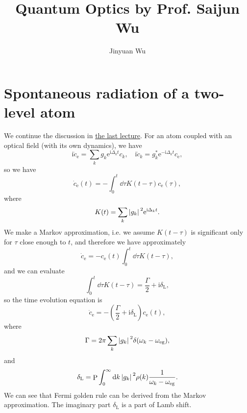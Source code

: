 \documentclass[hyperref, a4paper]{article}
\title{Quantum Optics by Prof. Saijun Wu}
\author{Jinyuan Wu}
\DeclareMathOperator{\primevalue}{P}
\newcommand*{\ii}{\mathrm{i}}
\newcommand*{\ee}{\mathrm{e}}
\begin{document}
\maketitle

\section{Spontaneous radiation of a two-level atom}

We continue the discussion in \href{11-18.pdf}{the last lecture}.
For an atom coupled with an optical field (with its own dynamics), we have 
\[
    \ii \dot{c}_\text{e} = \sum_k g_k \ee^{\ii \Delta_k t} c_k, \quad 
    \ii \dot{c}_k = g_k^* \ee^{- \ii \Delta_k t} c_\text{e},
\]
so we have 
\begin{equation}
    \dot{c}_\text{e}(t) = - \int_0^t \dd{\tau} K(t - \tau) c_\text{e}(\tau),
    \label{eq:one-component-eom}
\end{equation}
where 
\begin{equation}
    K(t) = \sum_k \abs*{g_k}^2 \ee^{\ii \Delta_k t}.
\end{equation}
We make a Markov approximation, i.e. we assume $K(t - \tau)$ is significant only for $\tau$ close enough to $t$,
and therefore we have approximately
\[
    \dot{c}_\text{e} = - c_\text{e}(t) \int_0^t \dd{\tau} K(t - \tau),
\]
and we can evaluate 
\[
    \int_0^t \dd{\tau} K(t - \tau) = \frac{\Gamma}{2} + \ii \delta_\text{L},
\]
so the time evolution equation is 
\begin{equation}
    \dot{c}_\text{e} = - \left( \frac{\Gamma}{2} + \ii \delta_\text{L} \right) c_\text{e}(t) ,
    \label{eq:markov-eq}
\end{equation}
where 
\begin{equation}
    \Gamma = 2 \pi \sum_k \abs*{g_k}^2 \delta(\omega_k - \omega_\text{eg}),
    \label{eq:scattering-rate}
\end{equation}
and 
\begin{equation}
    \delta_\text{L} = \primevalue \int_0^\infty \dd{k} \abs*{g_k}^2 \rho(k) \frac{1}{\omega_k - \omega_\text{eg}}.
    \label{eq:phase-shift}
\end{equation}
We can see that Fermi golden rule can be derived from the Markov approximation.
The imaginary part $\delta_\text{L}$ is a part of Lamb shift.
\end{document}
